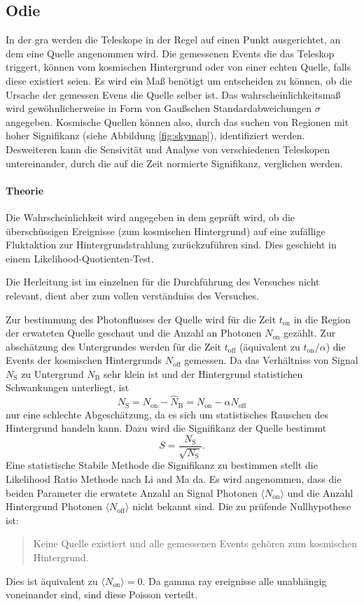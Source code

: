 \subsection{Odie}%
\label{sub:odie}
In der gra werden die Teleskope in der Regel auf einen Punkt 
ausgerichtet, an dem eine Quelle angenommen wird.
Die gemessenen Events die das Teleskop triggert, können vom 
kosmischen Hintergrund oder von einer echten Quelle, falls diese existiert seien.
Es wird ein Maß benötigt um entscheiden zu können, 
ob die Ursache der gemessen Evens die Quelle selber ist.
Das wahrscheinlichkeitsmaß wird gewöhnlicherweise in Form von Gaußschen
Standardabweichungen $\sigma$ angegeben. 
Kosmische Quellen können also, 
durch das suchen von Regionen mit hoher Signifikanz (siehe 
Abbildung \ref{fig:skymap}),
identifiziert werden.
Desweiteren kann die Sensivität und Analyse von verschiedenen 
Teleskopen untereinander,
durch die auf die Zeit normierte Signifikanz,
verglichen werden.

\paragraph{Theorie}%
Die Wahrscheinlichkeit wird angegeben in dem geprüft wird, ob die überschüssigen
Ereignisse (zum kosmischen Hintergrund)  auf eine zufällige Fluktaktion zur
Hintergrundstrahlung zurückzuführen sind.
Dies geschieht in einem Likelihood-Quotienten-Test.

Die Herleitung ist im einzelnen für die Durchführung des 
Versuches nicht relevant, 
dient aber zum vollen verständniss des Versuches.

Zur bestimmung des Photonflusses der Quelle wird für die Zeit $t_\text{on}$ in die Region der
erwateten Quelle geschaut und die Anzahl an Photonen $N_\text{on}$ gezählt.
Zur abschätzung des Untergrundes werden für die Zeit $t_\text{off}$ 
(äquivalent zu $t_\text{on} / \alpha$)
die Events der kosmischen Hintergrunds $N_\text{off}$ gemessen.
Da das Verhältniss von Signal $N_\text{S}$ zu Untergrund 
$N_\text{B}$ sehr klein ist 
und der Hintergrund statistichen Schwankungen unterliegt,
ist 
\begin{equation}
	N_\text{S} = N_\text{on} - \hat{N}_\text{B} = N_\text{on} - \alpha N_\text{off}
\end{equation}
nur eine schlechte Abgeschätzung, da es sich um statistisches Rauschen des
Hintergrund handeln kann.
Dazu wird die Signifikanz der Quelle bestimmt
\begin{equation}
	S = \frac{N_\text{S}}{\sqrt{N_\text{S}}} .
\end{equation}
Eine statistische Stabile Methode die Signifikanz zu bestimmen stellt die
Likelihood Ratio Methode nach Li and Ma da.
Es wird angenommen, dass die beiden Parameter die erwatete Anzahl an Signal
Photonen $\langle N_\text{on} \rangle$ und die Anzahl Hintergrund Photonen
$\langle N_\text{off} \rangle$ nicht bekannt sind. 
Die zu prüfende Nullhypothese ist: 
\begin{quote}
	Keine Quelle existiert und 
	alle gemessenen Events gehören zum kosmischen Hintergrund.
\end{quote}
Dies ist äquivalent zu $\langle N_\text{on} \rangle=0$.
Da gamma ray ereignisse alle unabhängig voneinander sind, sind diese Poisson
verteilt.

